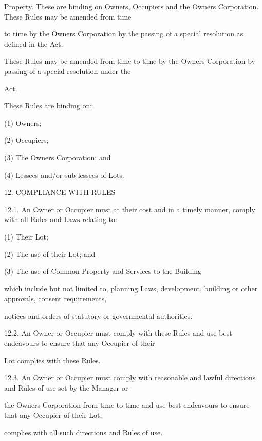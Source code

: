 \documentclass{article}
\begin{document}
{\fontsize{10.02}{1}Property. These are binding on Owners, Occupiers and the Owners Corporation. These Rules may be amended from time }

{\fontsize{10.02}{1}to time by the Owners Corporation by the passing of a special resolution as defined in the Act. }

{\fontsize{10.02}{1}These Rules may be amended from time to time by the Owners Corporation by passing of a special resolution under the }

{\fontsize{10.02}{1}Act. }

{\fontsize{10.02}{1}These Rules are binding on: }

{\fontsize{9.962}{1}(1) Owners; }

{\fontsize{9.962}{1}(2) Occupiers; }

{\fontsize{9.962}{1}(3) The Owners Corporation; and }

{\fontsize{9.962}{1}(4) Lessees and/or sub-lessees of Lots. }

{\fontsize{9.99}{1}12. COMPLIANCE WITH RULES }

{\fontsize{9.99}{1}12.1. An Owner or Occupier must at their cost and in a timely manner, comply with all Rules and Laws relating to: }

{\fontsize{9.962}{1}(1) Their Lot; }

{\fontsize{9.962}{1}(2) The use of their Lot; and }

{\fontsize{9.962}{1}(3) The use of Common Property and Services to the Building }

{\fontsize{10.02}{1}which include but not limited to, planning Laws, development, building or other approvals, consent requirements, }

{\fontsize{10.02}{1}notices and orders of statutory or governmental authorities. }

{\fontsize{9.99}{1}12.2. An Owner or Occupier must comply with these Rules and use best endeavours to ensure that any Occupier of their }

{\fontsize{10.02}{1}Lot complies with these Rules. }

{\fontsize{9.99}{1}12.3. An Owner or Occupier must comply with reasonable and lawful directions and Rules of use set by the Manager or }

{\fontsize{10.02}{1}the Owners Corporation from time to time and use best endeavours to ensure that any Occupier of their Lot, }

{\fontsize{10.02}{1}complies with all such directions and Rules of use. }
\end{document}
